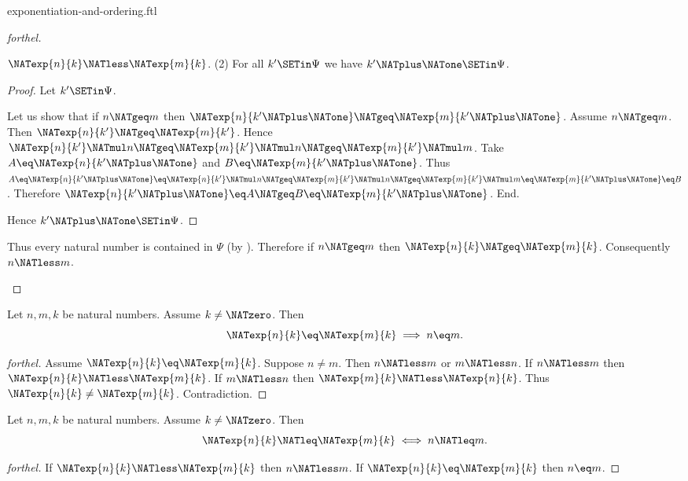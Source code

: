 \documentclass{naproche-library}
\begin{document}
\begin{smodule}[title=Exponentiation and Ordering]{exponentiation-and-ordering.ftl}
\begin{proof}[forthel]
\begin{case}{$\NATexp{n}{k} \NATless \NATexp{m}{k}$.}
    (2) For all $k' \SETin \Psi$ we have $k' \NATplus \NATone \SETin \Psi$.
    \begin{proof}
      Let $k' \SETin \Psi$.

      Let us show that if $n \NATgeq m$ then $\NATexp{n}{k' \NATplus \NATone} \NATgeq \NATexp{m}{k' \NATplus \NATone}$.
        Assume $n \NATgeq m$.
        Then $\NATexp{n}{k'} \NATgeq \NATexp{m}{k'}$.
        Hence $\NATexp{n}{k'} \NATmul n \NATgeq \NATexp{m}{k'} \NATmul n \NATgeq \NATexp{m}{k'} \NATmul m$.
        Take $A \eq \NATexp{n}{k' \NATplus \NATone}$ and $B \eq \NATexp{m}{k' \NATplus \NATone}$. %
        Thus $A
          \eq \NATexp{n}{k' \NATplus \NATone}
          \eq \NATexp{n}{k'} \NATmul n
          \NATgeq \NATexp{m}{k'} \NATmul n
          \NATgeq \NATexp{m}{k'} \NATmul m
          \eq \NATexp{m}{k' \NATplus \NATone}
          \eq B$.
        Therefore $\NATexp{n}{k' \NATplus \NATone} \eq A \NATgeq B \eq \NATexp{m}{k' \NATplus \NATone}$.
      End.

      Hence $k' \NATplus \NATone \SETin \Psi$.
    \end{proof}

    Thus every natural number is contained in $\Psi$ (by ).
    Therefore if $n \NATgeq m$ then $\NATexp{n}{k} \NATgeq \NATexp{m}{k}$.
    Consequently $n \NATless m$.
  \end{case}
\end{proof}

\begin{corollary}[forthel,id=ARITHMETIC_09_2797602550579200]
  Let $n, m, k$ be natural numbers.
  Assume $k \neq \NATzero$.
  Then \[ \NATexp{n}{k} \eq \NATexp{m}{k} \implies n \eq m. \]
\end{corollary}
\begin{proof}[forthel]
  Assume $\NATexp{n}{k} \eq \NATexp{m}{k}$.
  Suppose $n \neq m$.
  Then $n \NATless m$ or $m \NATless n$.
  If $n \NATless m$ then $\NATexp{n}{k} \NATless \NATexp{m}{k}$.
  If $m \NATless n$ then $\NATexp{m}{k} \NATless \NATexp{n}{k}$.
  Thus $\NATexp{n}{k} \neq \NATexp{m}{k}$.
  Contradiction.
\end{proof}

\begin{corollary}[forthel,id=ARITHMETIC_09_6875081963732992]
  Let $n, m, k$ be natural numbers.
  Assume $k \neq \NATzero$.
  Then \[ \NATexp{n}{k} \NATleq \NATexp{m}{k} \iff n \NATleq m. \]
\end{corollary}
\begin{proof}[forthel]
  If $\NATexp{n}{k} \NATless \NATexp{m}{k}$ then $n \NATless m$.
  If $\NATexp{n}{k} \eq \NATexp{m}{k}$ then $n \eq m$.


\end{proof}
\end{smodule}
\end{document}
